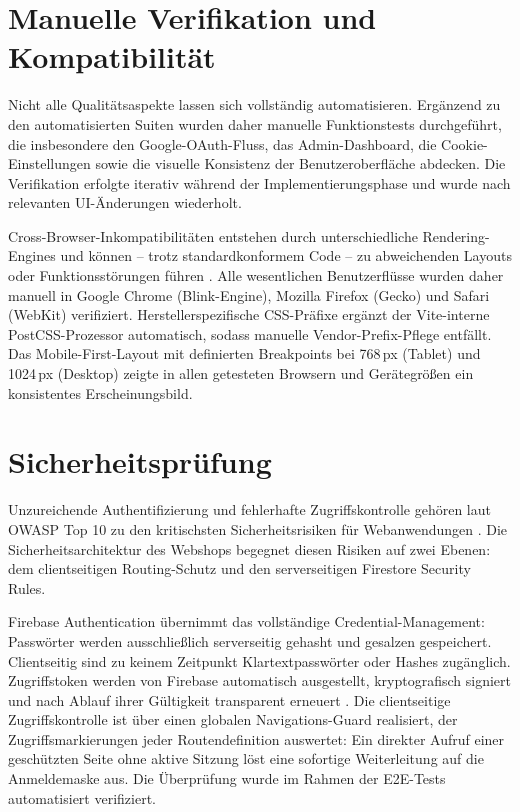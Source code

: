 \section{Manuelle Verifikation und Kompatibilität}
\label{sec:manuelle-tests}

Nicht alle Qualitätsaspekte lassen sich vollständig automatisieren. Ergänzend zu den automatisierten Suiten wurden daher manuelle Funktionstests durchgeführt, die insbesondere den Google-OAuth-Fluss, das Admin-Dashboard, die Cookie-Einstellungen sowie die visuelle Konsistenz der Benutzeroberfläche abdecken. Die Verifikation erfolgte iterativ während der Implementierungsphase und wurde nach relevanten UI-Änderungen wiederholt.

Cross-Browser-Inkompatibilitäten entstehen durch unterschiedliche Rendering-Engines und können -- trotz standardkonformem Code -- zu abweichenden Layouts oder Funktionsstörungen führen \cite{watanabe2023}. Alle wesentlichen Benutzerflüsse wurden daher manuell in Google Chrome (Blink-Engine), Mozilla Firefox (Gecko) und Safari (WebKit) verifiziert. Herstellerspezifische CSS-Präfixe ergänzt der Vite-interne PostCSS-Prozessor automatisch, sodass manuelle Vendor-Prefix-Pflege entfällt. Das Mobile-First-Layout mit definierten Breakpoints bei 768\,px (Tablet) und 1024\,px (Desktop) zeigte in allen getesteten Browsern und Gerätegrößen ein konsistentes Erscheinungsbild.

\section{Sicherheitsprüfung}
\label{sec:sicherheit-test}

Unzureichende Authentifizierung und fehlerhafte Zugriffskontrolle gehören laut OWASP Top 10 zu den kritischsten Sicherheitsrisiken für Webanwendungen \cite{wen2023, fredj2020}. Die Sicherheitsarchitektur des Webshops begegnet diesen Risiken auf zwei Ebenen: dem clientseitigen Routing-Schutz und den serverseitigen Firestore Security Rules.

Firebase Authentication übernimmt das vollständige Credential-Management: Passwörter werden ausschließlich serverseitig gehasht und gesalzen gespeichert. Clientseitig sind zu keinem Zeitpunkt Klartextpasswörter oder Hashes zugänglich. Zugriffstoken werden von Firebase automatisch ausgestellt, kryptografisch signiert und nach Ablauf ihrer Gültigkeit transparent erneuert \cite{bucko2023, firebaseAuth2025}. Die clientseitige Zugriffskontrolle ist über einen globalen Navigations-Guard realisiert, der Zugriffsmarkierungen jeder Routendefinition auswertet: Ein direkter Aufruf einer geschützten Seite ohne aktive Sitzung löst eine sofortige Weiterleitung auf die Anmeldemaske aus. Die Überprüfung wurde im Rahmen der E2E-Tests automatisiert verifiziert.

